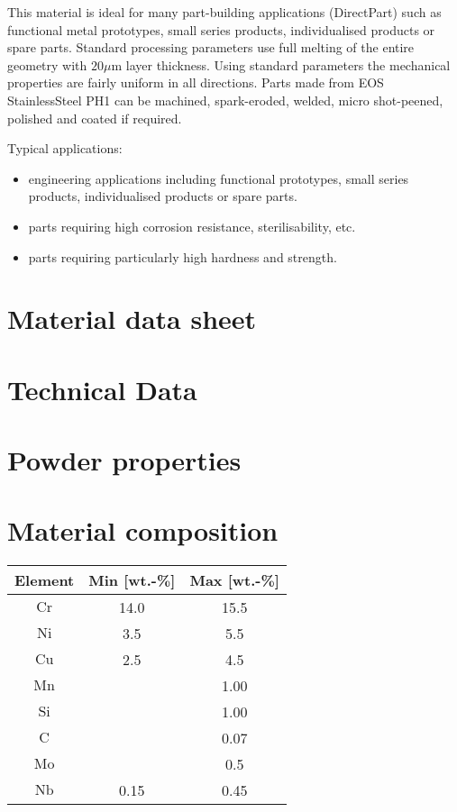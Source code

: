 \documentclass[10pt]{article}
\begin{document}
This material is ideal for many part-building applications (DirectPart) such as functional metal prototypes, small series products, individualised products or spare parts. Standard processing parameters use full melting of the entire geometry with $20 \mu \mathrm{m}$ layer thickness. Using standard parameters the mechanical properties are fairly uniform in all directions. Parts made from EOS StainlessSteel PH1 can be machined, spark-eroded, welded, micro shot-peened, polished and coated if required.

Typical applications:

\begin{itemize}
  \item engineering applications including functional prototypes, small series products, individualised products or spare parts.
  \item parts requiring high corrosion resistance, sterilisability, etc.
  \item parts requiring particularly high hardness and strength.
\end{itemize}

\section*{Material data sheet}
\section*{Technical Data}
\section*{Powder properties}
\section*{Material composition}
\begin{center}
\begin{tabular}{ccc}
Element & Min [wt.-\%] & Max [wt.-\%] \\
\hline
$\mathrm{Cr}$ & 14.0 & 15.5 \\
\hline
$\mathrm{Ni}$ & 3.5 & 5.5 \\
\hline
$\mathrm{Cu}$ & 2.5 & 4.5 \\
\hline
$\mathrm{Mn}$ &  & 1.00 \\
\hline
$\mathrm{Si}$ &  & 1.00 \\
\hline
$\mathrm{C}$ &  & 0.07 \\
\hline
$\mathrm{Mo}$ &  & 0.5 \\
\hline
$\mathrm{Nb}$ & 0.15 & 0.45 \\
\hline
\end{tabular}
\end{center}
\end{document}
